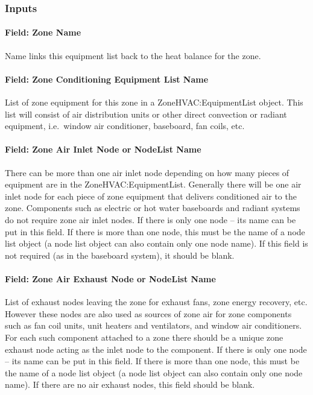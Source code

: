 \subsubsection{Inputs}\label{inputs-1-052}

\paragraph{Field: Zone Name}\label{field-zone-name-015}

Name links this equipment list back to the heat balance for the zone.

\paragraph{Field: Zone Conditioning Equipment List Name}\label{field-zone-conditioning-equipment-list-name}

List of zone equipment for this zone in a ZoneHVAC:EquipmentList object. This list will consist of air distribution units or other direct convection or radiant equipment, i.e.~window air conditioner, baseboard, fan coils, etc.

\paragraph{Field: Zone Air Inlet Node or NodeList Name}\label{field-zone-air-inlet-node-or-nodelist-name}

There can be more than one air inlet node depending on how many pieces of equipment are in the ZoneHVAC:EquipmentList. Generally there will be one air inlet node for each piece of zone equipment that delivers conditioned air to the zone. Components such as electric or hot water baseboards and radiant systems do not require zone air inlet nodes. If there is only one node -- its name can be put in this field. If there is more than one node, this must be the name of a node list object (a node list object can also contain only one node name). If this field is not required (as in the baseboard system), it should be blank.

\paragraph{Field: Zone Air Exhaust Node or NodeList Name}\label{field-zone-air-exhaust-node-or-nodelist-name}

List of exhaust nodes leaving the zone for exhaust fans, zone energy recovery, etc. However these nodes are also used as sources of zone air for zone components such as fan coil units, unit heaters and ventilators, and window air conditioners. For each such component attached to a zone there should be a unique zone exhaust node acting as the inlet node to the component. If there is only one node -- its name can be put in this field. If there is more than one node, this must be the name of a node list object (a node list object can also contain only one node name). If there are no air exhaust nodes, this field should be blank.

